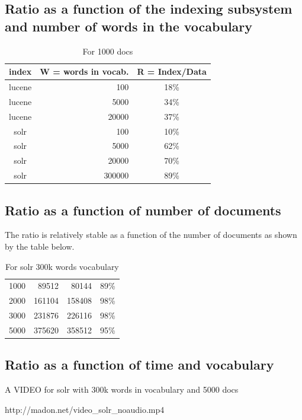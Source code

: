 \documentclass[12pt,a4]{article}
\begin{document}
\subsection{Ratio as a function of the indexing subsystem and number of words in the vocabulary}
\begin{table}[h]
\begin{center}
\begin{tabular}{|c | r | c|}
\hline
index & W = words in vocab. & R = Index/Data\\ \hline
lucene & 100 & 18\%\\
lucene & 5000 & 34\%\\
lucene & 20000 & 37\%\\
solr & 100 & 10\%\\
solr & 5000 & 62\%\\
solr & 20000 & 70\%\\
solr & 300000 & 89\%\\
\hline
\end{tabular}
\end{center}
\caption{For 1000 docs}
\end{table}

\subsection{Ratio as a function of number of documents}
The ratio is relatively stable as a function of the number of documents as shown by the table below.
\begin{table}[h]
\begin{center}
\begin{tabular}{|c | r  | r| c|}
\hline
1000 &89512 & 80144 & 89\%\\
2000 &161104 & 158408& 98\%\\
3000 & 231876 & 226116& 98\%\\
5000 & 375620 & 358512 & 95\%\\
\hline
\end{tabular}
\end{center}
\caption{For solr 300k words vocabulary}
\end{table}


\subsection{Ratio as a function of time and vocabulary}
A VIDEO for solr with 300k words in vocabulary and 5000 docs

http://madon.net/video\_solr\_noaudio.mp4
\end{document}

